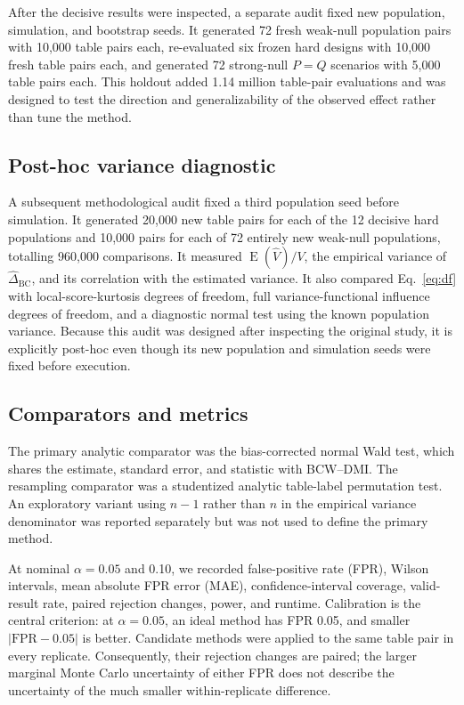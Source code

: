 \documentclass[10pt,twocolumn]{article}
\newcommand{\E}{\operatorname{E}}
\newcommand{\method}{BCW--DMI}
\begin{document}
After the decisive results were inspected, a separate audit fixed new
population, simulation, and bootstrap seeds. It generated 72 fresh weak-null
population pairs with 10,000 table pairs each, re-evaluated six frozen hard
designs with 10,000 fresh table pairs each, and generated 72 strong-null
\(P=Q\) scenarios with 5,000 table pairs each. This holdout added 1.14 million
table-pair evaluations and was designed to test the direction and
generalizability of the observed effect rather than tune the method.

\subsection{Post-hoc variance diagnostic}

A subsequent methodological audit fixed a third population seed before
simulation. It generated 20,000 new table pairs for each of the 12 decisive
hard populations and 10,000 pairs for each of 72 entirely new weak-null
populations, totalling 960,000 comparisons. It measured
\(\E(\widehat V)/V\), the empirical variance of
\(\widehat\Delta_{\mathrm{BC}}\), and its correlation with the estimated
variance. It also compared Eq.~\eqref{eq:df} with local-score-kurtosis degrees
of freedom, full variance-functional influence degrees of freedom, and a
diagnostic normal test using the known population variance. Because this
audit was designed after inspecting the original study, it is explicitly
post-hoc even though its new population and simulation seeds were fixed
before execution.

\subsection{Comparators and metrics}

The primary analytic comparator was the bias-corrected normal Wald test,
which shares the estimate, standard error, and statistic with \method. The
resampling comparator was a studentized analytic table-label permutation
test. An exploratory variant using \(n-1\) rather than \(n\) in the empirical
variance denominator was reported separately but was not used to define the
primary method.

At nominal \(\alpha=0.05\) and 0.10, we recorded false-positive rate (FPR),
Wilson intervals, mean absolute FPR error (MAE), confidence-interval coverage,
valid-result rate, paired rejection changes, power, and runtime. Calibration
is the central criterion: at \(\alpha=0.05\), an ideal method has FPR 0.05,
and smaller \(|\mathrm{FPR}-0.05|\) is better. Candidate methods were applied
to the same table pair in every replicate. Consequently, their rejection
changes are paired; the larger marginal Monte Carlo uncertainty of either FPR
does not describe the uncertainty of the much smaller within-replicate
difference.
\end{document}
